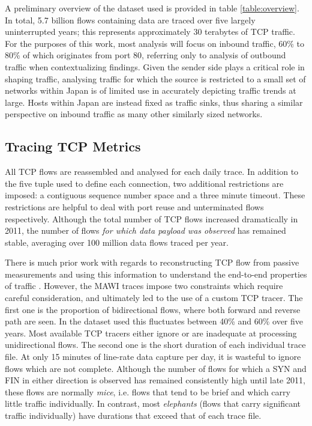A preliminary overview of the dataset used is provided in table \ref{table:overview}. 
In total, 5.7 billion flows containing data are traced over five largely uninterrupted years; this represents approximately 30 terabytes of \ac{TCP} traffic. For the purposes of this work, most analysis will focus on inbound traffic, 60\% to 80\% of which originates from port 80, referring only to analysis of outbound traffic when contextualizing findings.
Given the sender side plays a critical role in shaping traffic, analysing traffic for which the source is restricted to a small set of networks within Japan is of limited use in accurately depicting traffic trends at large.
Hosts within Japan are instead fixed as traffic sinks, thus sharing a similar perspective on inbound traffic as many other similarly sized networks. 

\subsection{Tracing \acs{TCP} Metrics}

All \ac{TCP} flows are reassembled and analysed for each daily trace.
In addition to the five tuple used to define each connection, two additional restrictions are imposed: a contiguous sequence number space and a three minute timeout. 
These restrictions are helpful to deal with port reuse and unterminated flows respectively.  
Although the total number of \ac{TCP} flows increased dramatically in 2011, the number of flows \emph{for which data payload was observed} has remained stable, averaging over 100 million data flows traced per year.  

There is much prior work with regards to reconstructing \ac{TCP} flow from passive measurements and using this information to understand the end-to-end properties of traffic \cite{firstRTT,Jaiswal:2007p233,Rewaskar:2007p195,Shakkottai:2004p408}. 
However, the \acs{MAWI} traces impose two constraints which require careful consideration, and ultimately led to the use of a custom \ac{TCP} tracer. 
The first one is the proportion of bidirectional flows, where both forward and reverse path are seen. 
In the dataset used this fluctuates between 40\% and 60\% over five years.
Most available \ac{TCP} tracers either ignore or are inadequate at processing unidirectional flows. 
The second one is the short duration of each individual trace file. 
At only 15 minutes of line-rate data capture per day, it is wasteful to ignore flows which are not complete. 
Although the number of flows for which a SYN and FIN in either direction is observed has remained consistently high until late 2011, these flows are normally \emph{mice}, i.e. flows that tend to be brief and which carry little traffic individually. 
In contrast, most \emph{elephants} (flows that carry significant traffic individually) have durations that exceed that of each trace file. 

